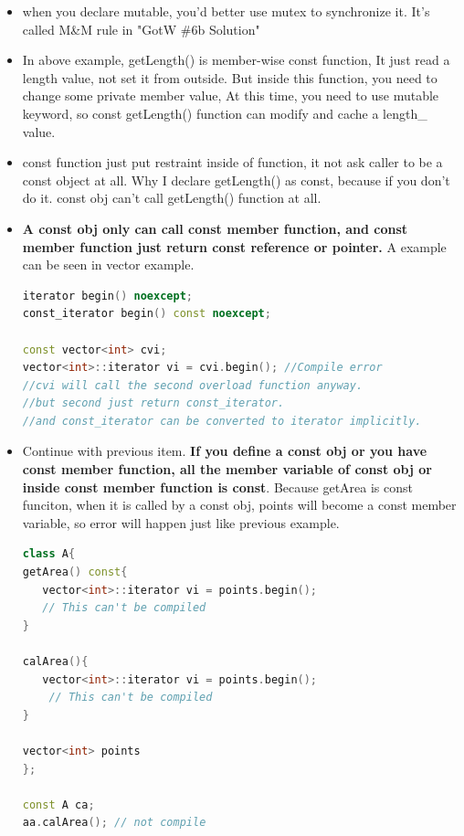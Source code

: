 \documentclass[a4paper,12pt,twoside]{book}
\begin{document}
\begin{itemize}
\item when you declare mutable, you'd better use mutex to synchronize it. It's called M\&M rule in "GotW \#6b Solution"

\item In above example, getLength() is member-wise const function, It just read a length value, not set it from outside. But inside this function, you need to change some private member value, At this time, you need to use mutable keyword, so const getLength() function can modify and cache a length\_ value.

\item const function just put restraint inside of function, it not ask caller to be a const object at all. Why I declare getLength() as const, because if you don't do it. const obj can't call getLength() function at all. 

\item \textbf{A const obj only can call const member function, and const member function just return const reference or pointer.} A example can be seen in vector example.  

\begin{lstlisting}[frame=single, language=c++]
   iterator begin() noexcept;
const_iterator begin() const noexcept;

const vector<int> cvi;
vector<int>::iterator vi = cvi.begin(); //Compile error
//cvi will call the second overload function anyway.
//but second just return const_iterator. 
//and const_iterator can be converted to iterator implicitly.
\end{lstlisting}

\item Continue with previous item.\textbf{ If you define a const obj or you have const member function, all the member variable of const obj or inside const member function is const}. Because getArea is const funciton, when it is called by a const obj, points will become a const member variable, so error will happen just like previous example. 

\begin{lstlisting}[frame=single, language=c++]
class A{
getArea() const{
   vector<int>::iterator vi = points.begin();
   // This can't be compiled
}

calArea(){
   vector<int>::iterator vi = points.begin();
    // This can't be compiled
}

vector<int> points
};

const A ca;
aa.calArea(); // not compile


\end{lstlisting}
\end{itemize}
\end{document}
